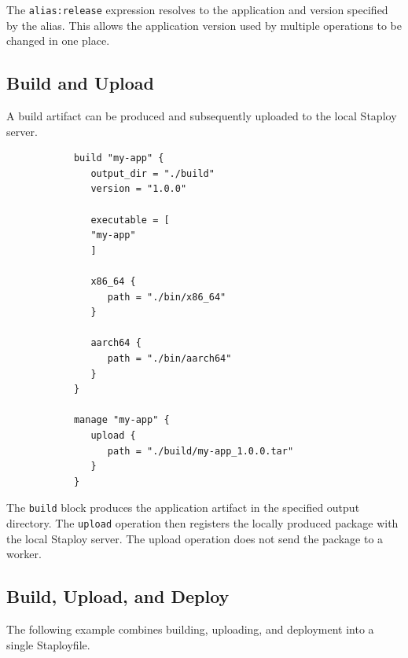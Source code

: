 \documentclass[11pt,a4paper]{article}
\begin{document}
    The \texttt{alias:release} expression resolves to the application and version specified by the alias.
    This allows the application version used by multiple operations to be changed in one place.

    \subsection{Build and Upload}\label{subsec:build-and-upload}

    A build artifact can be produced and subsequently uploaded to the local Staploy server.

    \begin{center}
        \begin{verbatim}
            build "my-app" {
               output_dir = "./build"
               version = "1.0.0"

               executable = [
               "my-app"
               ]

               x86_64 {
                  path = "./bin/x86_64"
               }

               aarch64 {
                  path = "./bin/aarch64"
               }
            }

            manage "my-app" {
               upload {
                  path = "./build/my-app_1.0.0.tar"
               }
            }
        \end{verbatim}
    \end{center}

    The \texttt{build} block produces the application artifact in the specified output directory.
    The \texttt{upload} operation then registers the locally produced package with the local Staploy server.
    The upload operation does not send the package to a worker.

    \subsection{Build, Upload, and Deploy}\label{subsec:build-upload-and-deploy}

    The following example combines building, uploading, and deployment into a single Staployfile.
\end{document}
